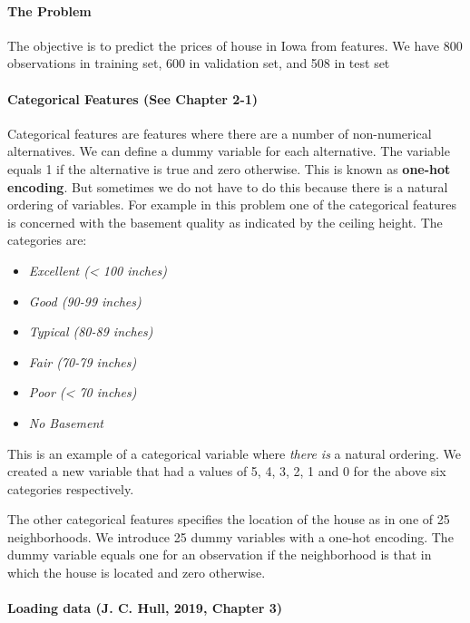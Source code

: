 \documentclass[11pt]{article}
\providecommand{\tightlist}{%
      \setlength{\itemsep}{0pt}\setlength{\parskip}{0pt}}
\begin{document}
    \hypertarget{the-problem}{%
\paragraph{The Problem}\label{the-problem}}

The objective is to predict the prices of house in Iowa from features.
We have 800 observations in training set, 600 in validation set, and 508
in test set

    \hypertarget{categorical-features-see-chapter-2-1}{%
\paragraph{Categorical Features (See Chapter
2-1)}\label{categorical-features-see-chapter-2-1}}

Categorical features are features where there are a number of
non-numerical alternatives. We can define a dummy variable for each
alternative. The variable equals 1 if the alternative is true and zero
otherwise. This is known as \textbf{one-hot encoding}. But sometimes we
do not have to do this because there is a natural ordering of variables.
For example in this problem one of the categorical features is concerned
with the basement quality as indicated by the ceiling height. The
categories are:

\begin{itemize}
\tightlist
\item
  \emph{Excellent (\textless{} 100 inches)}
\item
  \emph{Good (90-99 inches)}
\item
  \emph{Typical (80-89 inches)}
\item
  \emph{Fair (70-79 inches)}
\item
  \emph{Poor (\textless{} 70 inches)}
\item
  \emph{No Basement}
\end{itemize}

This is an example of a categorical variable where \emph{there is} a
natural ordering. We created a new variable that had a values of 5, 4,
3, 2, 1 and 0 for the above six categories respectively.

The other categorical features specifies the location of the house as in
one of 25 neighborhoods. We introduce 25 dummy variables with a one-hot
encoding. The dummy variable equals one for an observation if the
neighborhood is that in which the house is located and zero otherwise.

    \hypertarget{loading-data-j.-c.-hull-2019-chapter-3}{%
\paragraph{Loading data (J. C. Hull, 2019, Chapter
3)}\label{loading-data-j.-c.-hull-2019-chapter-3}}
\end{document}
